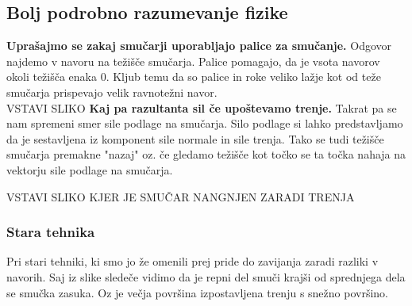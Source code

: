 \documentclass{article}
\begin{document}
\subsection{Bolj podrobno razumevanje fizike}
\textbf{Uprašajmo se zakaj smučarji uporabljajo palice za smučanje.} Odgovor najdemo v navoru na težišče smučarja.
Palice pomagajo, da je vsota navorov okoli težišča enaka 0. Kljub temu da so palice in roke veliko lažje kot
od teže smučarja prispevajo velik ravnotežni navor. \\ \newline
VSTAVI SLIKO
\textbf{Kaj pa razultanta sil če upoštevamo trenje.} Takrat pa se nam spremeni smer sile podlage na smučarja.
Silo podlage si lahko predstavljamo da je sestavljena iz komponent sile normale in sile trenja. 
Tako se tudi težišče smučarja premakne "nazaj" oz. če gledamo težišče kot točko se ta točka nahaja na vektorju
sile podlage na smučarja. \\ \newline

VSTAVI SLIKO KJER JE SMUČAR NANGNJEN ZARADI TRENJA
\subsubsection*{Stara tehnika}
Pri stari tehniki, ki smo jo že omenili prej pride do zavijanja zaradi razliki v navorih. Saj iz slike sledeče vidimo
da je repni del smuči krajši od sprednjega dela se smučka zasuka. Oz je večja površina izpostavljena trenju s snežno površino.
\end{document}
